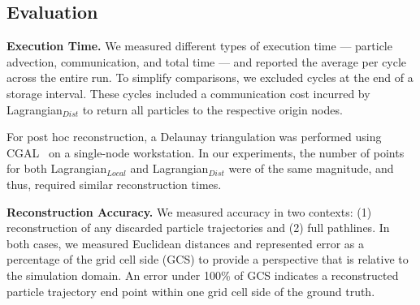 \vspace{-2mm}
\subsection{Evaluation}
\label{sec:metrics}
%
\textbf{Execution Time.} We measured different types of execution time --- particle advection, communication, and total time --- and reported the average per cycle across the entire run.
%
To simplify comparisons, we excluded cycles at the end of a storage interval. 
%
These cycles included a communication cost incurred by Lagrangian$_{Dist}$ to return all particles to the respective origin nodes. 
%

For post hoc reconstruction, a Delaunay triangulation was performed using CGAL~\cite{2020cgal} on a single-node workstation.
%
In our experiments, the number of points for both Lagrangian$_{Local}$ and Lagrangian$_{Dist}$ were of the same magnitude, and thus, required similar reconstruction times.
%
%
%
%
%
%

\textbf{Reconstruction Accuracy.} We measured accuracy in two contexts: (1) reconstruction of any discarded particle trajectories and (2) full pathlines.  
%
In both cases, we measured Euclidean distances and represented error as a percentage of the grid cell side (GCS) to provide a perspective that is relative to the simulation domain.
%
An error under 100\% of GCS indicates a reconstructed particle trajectory end point within one grid cell side of the ground truth.

